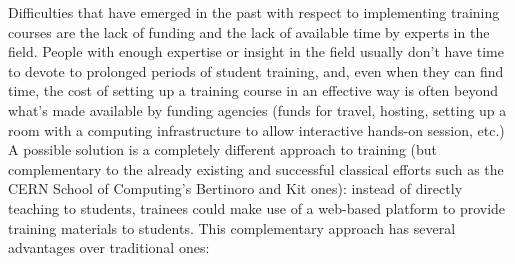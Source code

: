 Difficulties that have emerged in the past with respect to implementing training courses are the lack of funding and the lack of available time by experts in the field. People with enough expertise or insight in the field usually don't have time to devote to prolonged periods of student training, and, even when they can find time, the cost of setting up a training course in an effective way is often beyond what's made available by funding agencies (funds for travel, hosting, setting up a room with a computing infrastructure to allow interactive hands-on session, etc.) A possible solution is a completely different approach to training (but complementary to the already existing and successful classical efforts such as the CERN School of Computing's Bertinoro and Kit ones): instead of directly teaching to students, trainees could make use of a web-based platform to provide training materials to students. This complementary approach has several advantages over traditional ones:
